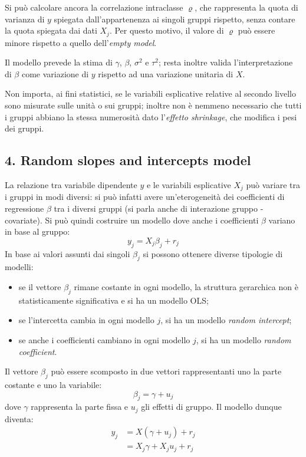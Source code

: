 \documentclass[a4page, 11pt]{article} %
\begin{document}
Si può calcolare ancora la correlazione intraclasse $\varrho$, che rappresenta la quota di varianza di $y$ spiegata dall'appartenenza ai singoli gruppi rispetto, senza contare la quota spiegata dai dati $X_j$.
Per questo motivo, il valore di $\varrho$ può essere minore rispetto a quello dell'\textit{empty model}.

Il modello prevede la stima di $\gamma$, $\beta$, $\sigma^2$ e $\tau^2$; resta inoltre valida l'interpretazione di $\beta$ come variazione di $y$ rispetto ad una variazione unitaria di $X$.

Non importa, ai fini statistici, se le variabili esplicative relative al secondo livello sono misurate sulle unità o sui gruppi; inoltre non è nemmeno necessario che tutti i gruppi abbiano la stessa numerosità dato l'\textit{effetto shrinkage}, che modifica i pesi dei gruppi.

\subsection*{4. Random slopes and intercepts model} 
La relazione tra variabile dipendente $y$ e le variabili esplicative $X_j$ può variare tra i gruppi in modi diversi: si può infatti avere un’eterogeneità dei coefficienti di regressione $\beta$ tra i diversi gruppi (si parla anche di interazione gruppo - covariate).
Si può quindi costruire un modello dove anche i coefficienti $\beta$ variano in base al gruppo:
\begin{equation*}
y_j = X_j \beta_j + r_j
\end{equation*}
In base ai valori assunti dai singoli $\beta_j$ si possono ottenere diverse tipologie di modelli:
\begin{itemize}[noitemsep]
  \item se il vettore $\beta_j$ rimane costante in ogni modello, la struttura gerarchica non è statisticamente significativa e si ha un modello OLS;
\item se l'intercetta cambia in ogni modello $j$, si ha un modello \textit{random intercept};
\item se anche i coefficienti cambiano in ogni modello $j$, si ha un modello \textit{random coefficient}.
\end{itemize}
Il vettore $\beta_j$ può essere scomposto in due vettori rappresentanti uno la parte costante e uno la variabile:
\begin{equation*}
  \beta_j = \gamma + u_j
\end{equation*}
dove  $\gamma$ rappresenta la parte fissa e $u_j$ gli effetti di gruppo.
Il modello dunque diventa:
\begin{align*}
  y_j &= X (\gamma + u_j) + r_j \\
      &= X_j \gamma + X_j u_j + r_j
\end{align*}
\end{document}
